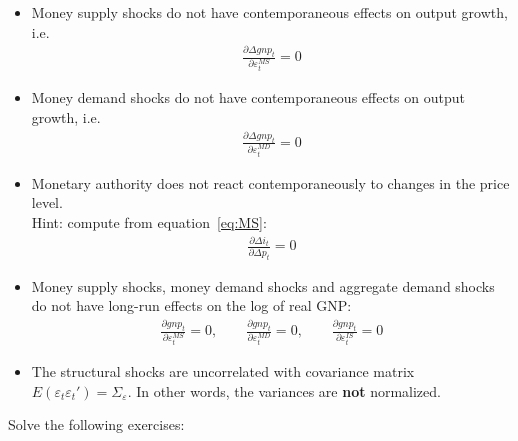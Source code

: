 \begin{itemize}
\item Money supply shocks do not have contemporaneous effects on output growth, i.e.\
\begin{align*}
\frac{\partial \Delta gnp_t}{\partial \varepsilon_t^{MS}}=0
\end{align*}

\item Money demand shocks do not have contemporaneous effects on output growth, i.e.\
\begin{align*}
\frac{\partial \Delta gnp_t}{\partial \varepsilon_t^{MD}}=0
\end{align*}

\item Monetary authority does not react contemporaneously to changes in the price level.\\Hint: compute from equation~\eqref{eq:MS}:
\begin{align*}
\frac{\partial \Delta i_t}{\partial \Delta p_t}=0
\end{align*}

\item Money supply shocks, money demand shocks and aggregate demand shocks do not have long-run effects on the log of real {GNP}:
\begin{align*}
\frac{\partial gnp_t}{\partial \varepsilon_t^{MS}}=0,\qquad \frac{\partial gnp_t}{\partial \varepsilon_t^{MD}}=0,\qquad \frac{\partial gnp_t}{\partial \varepsilon_t^{IS}}=0
\end{align*}

\item The structural shocks are uncorrelated with covariance matrix \(E(\varepsilon_t \varepsilon_t')=\Sigma_{\varepsilon} \).
In other words, the variances are \textbf{not} normalized.
\end{itemize}
Solve the following exercises:

